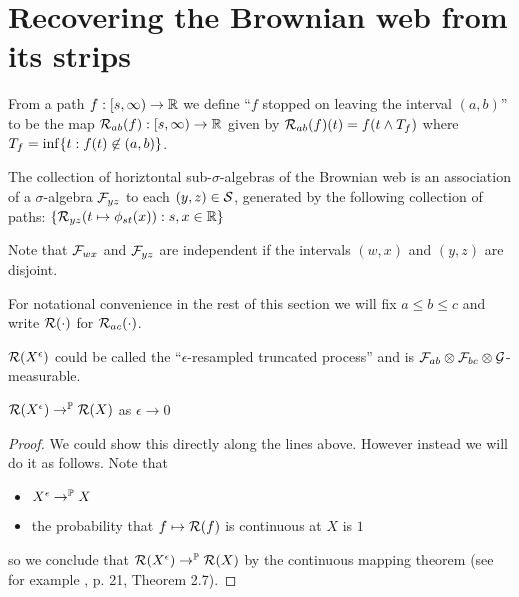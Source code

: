 {
\section{Recovering the Brownian web from its strips}

\begin{definition}
  \newcommand{\T}{\stripleavetime{f}}
  \label{def:restrict}
  From a path $f : [s, \infty) \to \mathbb{R}$ we define ``$f$ stopped on
    leaving the interval $(a,b)$'' to be the map $\mathcal{R}_{{a}{b}}(f) : [s,
      \infty) \to \mathbb{R}$ given by $\restrict{a}{b}{f}(t) = f(t \minsym \T)$
      where $\T = \inf\{ t : f(t) \not\in (a,b) \}$.
\end{definition}

\newcommand{\brownianwebnoise}{collection of horiztontal
  sub-$\sigma$-algebras of the Brownian web}

\begin{definition}
  The \brownianwebnoise{} is an
  association of a $\sigma$-algebra $\mathcal{F}_{y z}$ to each $(y, z)
  \in \mathcal{S}$, generated by the following collection of paths:
  $\{ \mathcal{R}_{{y}{z}}(t \mapsto \phi_{{s}{t}}(x)) : s, x \in \mathbb{R} \}$
\end{definition}

\begin{observation}
  Note that $\mathcal{F}_{w x}$ and $\mathcal{F}_{y z}$ are independent if the
  intervals $(w,x)$ and $(y,z)$ are disjoint.
\end{observation}

For notational convenience in the rest of this
section we will fix $a \le b \le c$ and write $\mathcal{R}(\cdot)$ for
$\mathcal{R}_{{a}{c}}(\cdot)$.

\begin{observation}
  $\mathcal{R}(X^{\epsilon})$ could be called the ``$\epsilon$-resampled
  truncated process'' and is $\mathcal{F}_{a b} \otimes \mathcal{F}_{b c}
  \otimes \mathcal{G}$-measurable.
\end{observation}

\begin{lemma}
  $\mathcal{R}(X^{\epsilon}) \to^{\mathbb{P}} \mathcal{R}(X)$ as $\epsilon \to 0$
\end{lemma}

\begin{proof}
  We could show this directly along the lines above.  However instead
  we will do it as follows.  Note that
  \begin{itemize}
  \item $X^{\epsilon} \to^{\mathbb{P}} X$
  \item the probability that $f \mapsto \mathcal{R}(f)$ is continuous
    at $X$ is $1$
  \end{itemize}
  so we conclude that $\mathcal{R}(X^{\epsilon}) \to^{\mathbb{P}}
  \mathcal{R}(X)$ by the continuous mapping theorem (see for
  example \cite{billingsley}, p. 21, Theorem 2.7).
\end{proof}

}
